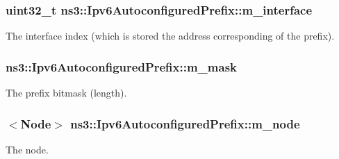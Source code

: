 \subsubsection[{\texorpdfstring{m\+\_\+interface}{m_interface}}]{\setlength{\rightskip}{0pt plus 5cm}uint32\+\_\+t ns3\+::\+Ipv6\+Autoconfigured\+Prefix\+::m\+\_\+interface\hspace{0.3cm}{\ttfamily [private]}}\hypertarget{classns3_1_1Ipv6AutoconfiguredPrefix_ac0f477beba95f490b54ee04bcfa1baec}{}\label{classns3_1_1Ipv6AutoconfiguredPrefix_ac0f477beba95f490b54ee04bcfa1baec}


The interface index (which is stored the address corresponding of the prefix). 

\subsubsection[{\texorpdfstring{m\+\_\+mask}{m_mask}}]{ ns3\+::\+Ipv6\+Autoconfigured\+Prefix\+::m\+\_\+mask\hspace{0.3cm}{\ttfamily [private]}}\hypertarget{classns3_1_1Ipv6AutoconfiguredPrefix_a3a063e4dd3fbe06abf124914f5ddfd0e}{}\label{classns3_1_1Ipv6AutoconfiguredPrefix_a3a063e4dd3fbe06abf124914f5ddfd0e}


The prefix bitmask (length). 

\subsubsection[{\texorpdfstring{m\+\_\+node}{m_node}}]{$<${\bf Node}$>$ ns3\+::\+Ipv6\+Autoconfigured\+Prefix\+::m\+\_\+node\hspace{0.3cm}{\ttfamily [private]}}\hypertarget{classns3_1_1Ipv6AutoconfiguredPrefix_a3ba6ab998d069c08eea40af5b8035db8}{}\label{classns3_1_1Ipv6AutoconfiguredPrefix_a3ba6ab998d069c08eea40af5b8035db8}


The node. 

